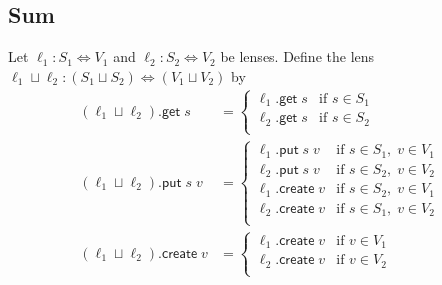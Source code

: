 \documentclass[acmsmall,review,anonymous]{acmart}\settopmatter{printfolios=true,printccs=false,printacmref=false}
\theoremstyle{definition}
\newcommand{\kw}[1]{\ensuremath{\mathsf{#1}}\xspace}
\newcommand{\get}{\ensuremath{\kw{get}}\xspace}
\newcommand{\pput}{\ensuremath{\kw{put}}\xspace}
\newcommand{\create}{\ensuremath{\kw{create}}\xspace}
\begin{document}
\subsection{Sum}
Let $\ell_1 : S_1 \Leftrightarrow V_1$ and $\ell_2 : S_2 \Leftrightarrow V_2$ be
lenses. Define the lens
$\ell_1 \sqcup \ell_2 :
(S_1 \sqcup S_2) \Leftrightarrow (V_1 \sqcup V_2)$ by
\begin{align*}
(\ell_1 \sqcup \ell_2).\get \; s &=
\begin{cases}
\ell_1.\get \; s & \text{if } s \in S_1\\
\ell_2.\get \; s & \text{if } s \in S_2\\
\end{cases}\\
(\ell_1 \sqcup \ell_2).\pput \; s \; v&=
\begin{cases}
\ell_1.\pput \; s \; v& \text{if } s \in S_1, \; v \in V_1\\
\ell_2.\pput \; s \; v& \text{if } s \in S_2, \; v \in V_2\\
\ell_1.\create \; v & \text{if } s \in S_2, \; v \in V_1\\
\ell_2.\create \; v & \text{if } s \in S_1, \; v \in V_2\\
\end{cases}\\
(\ell_1 \sqcup \ell_2).\create \; v &=
\begin{cases}
\ell_1.\create \; v & \text{if } v \in V_1\\
\ell_2.\create \; v & \text{if } v \in V_2\\
\end{cases}
\end{align*}
\end{document}
